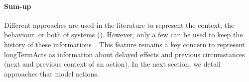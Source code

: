 \paragraph{Sum-up}
Different approaches are used in the literature to represent the context, the \gls{behaviour}, or both of systems (\cf {}).
However, only a few can be used to keep the history of these informations~\cite{DBLP:conf/seke/0001FNMKT14, DBLP:conf/models/0001FNMKBT14, 	DBLP:conf/dbpl/MoffittS17, DBLP:conf/icse/TaharaOH17, DBLP:conf/pervasive/HenricksenIR02, DBLP:conf/smartgridsec/0001FKNT14}.
This feature remains a key concern to represent \glspl{longTermAct} as information about delayed effects and previous \glspl{circumstance} (next and previous context of an action).
In the next section, we detail approaches that model actions.
	

